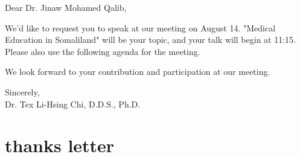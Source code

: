 \documentclass[25pt, a4paper]{letter}
\newcommand{\yourName}{Dr. Tex Li-Hsing Chi, D.D.S., Ph.D.}
\begin{document}
Dear Dr. Jinaw Mohamed Qalib,

We'd like to request you to speak at our meeting on August 14. "Medical Education in Somaliland" will be your topic, and your talk will begin at 11:15. Please also use the following agenda for the meeting.

We look forward to your contribution and participation at our meeting.

Sincerely, \\
\yourName









\section{thanks letter}
\end{document}
